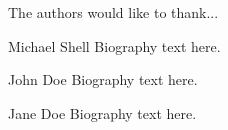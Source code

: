\documentclass[10pt,journal,compsoc]{IEEEtran}
\begin{document}
The authors would like to thank...


\ifCLASSOPTIONcaptionsoff
  \newpage
\fi





%
%

% 

\begin{IEEEbiography}{Michael Shell}
Biography text here.
\end{IEEEbiography}

\begin{IEEEbiographynophoto}{John Doe}
Biography text here.
\end{IEEEbiographynophoto}


\begin{IEEEbiographynophoto}{Jane Doe}
Biography text here.
\end{IEEEbiographynophoto}






\end{document}
